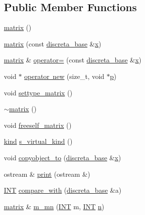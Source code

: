 \subsection*{Public Member Functions}
\begin{DoxyCompactItemize}
\item 
\mbox{\hyperlink{classmatrix_a4daf70b1506ea976352f20e4322a9c17}{matrix}} ()
\item 
\mbox{\hyperlink{classmatrix_ac9e2b8134d8bd8d9789133c187d81d74}{matrix}} (const \mbox{\hyperlink{classdiscreta__base}{discreta\+\_\+base}} \&\mbox{\hyperlink{alphabet2_8_c_a6150e0515f7202e2fb518f7206ed97dc}{x}})
\item 
\mbox{\hyperlink{classmatrix}{matrix}} \& \mbox{\hyperlink{classmatrix_a242b6281ca7b813d47d07bb474d10b8e}{operator=}} (const \mbox{\hyperlink{classdiscreta__base}{discreta\+\_\+base}} \&\mbox{\hyperlink{alphabet2_8_c_a6150e0515f7202e2fb518f7206ed97dc}{x}})
\item 
void $\ast$ \mbox{\hyperlink{classmatrix_af89d98f62742b78d8d67080a0c88763a}{operator new}} (size\+\_\+t, void $\ast$\mbox{\hyperlink{alphabet2_8_c_a533391314665d6bf1b5575e9a9cd8552}{p}})
\item 
void \mbox{\hyperlink{classmatrix_a1780283a64a789e4084d792683d276bb}{settype\+\_\+matrix}} ()
\item 
\mbox{\hyperlink{classmatrix_a8a2522496ff0ef7096ffcfdc851b85a1}{$\sim$matrix}} ()
\item 
void \mbox{\hyperlink{classmatrix_ab47d61820499f35c15bf82fb6a3b9bd1}{freeself\+\_\+matrix}} ()
\item 
\mbox{\hyperlink{discreta_8h_aaf25ee7e2306d78c74ec7bc48f092e81}{kind}} \mbox{\hyperlink{classmatrix_a4880cc2b5e8d3f8f2d8038580364db56}{s\+\_\+virtual\+\_\+kind}} ()
\item 
void \mbox{\hyperlink{classmatrix_a6a47f82604adaa39b21f6bfe6da9e898}{copyobject\+\_\+to}} (\mbox{\hyperlink{classdiscreta__base}{discreta\+\_\+base}} \&\mbox{\hyperlink{alphabet2_8_c_a6150e0515f7202e2fb518f7206ed97dc}{x}})
\item 
ostream \& \mbox{\hyperlink{classmatrix_aeb24c2fe68cc0a32d172c0fc06103dd2}{print}} (ostream \&)
\item 
\mbox{\hyperlink{galois_8h_a09fddde158a3a20bd2dcadb609de11dc}{I\+NT}} \mbox{\hyperlink{classmatrix_a6009a90834a208f5f0a83d8ed651e4c5}{compare\+\_\+with}} (\mbox{\hyperlink{classdiscreta__base}{discreta\+\_\+base}} \&a)
\item 
\mbox{\hyperlink{classmatrix}{matrix}} \& \mbox{\hyperlink{classmatrix_a85921e1b3c604f625989b1c3d1697792}{m\+\_\+mn}} (\mbox{\hyperlink{galois_8h_a09fddde158a3a20bd2dcadb609de11dc}{I\+NT}} m, \mbox{\hyperlink{galois_8h_a09fddde158a3a20bd2dcadb609de11dc}{I\+NT}} \mbox{\hyperlink{simeon_8_c_a7f2cd26777ce0ff3fdaf8d02aacbddfb}{n}})

\end{DoxyCompactItemize}
